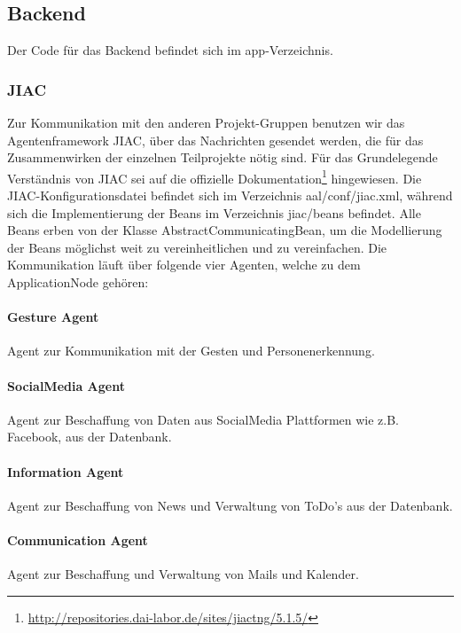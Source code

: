 \documentclass[10pt,a4paper]{report}
\newcommand{\code}[1]{{\fontfamily{cmvtt}\selectfont #1}}
\begin{document}
	

    \newpage
    \subsection{Backend}
    Der Code für das Backend befindet sich im \code{app}-Verzeichnis.
         \subsubsection{JIAC}
        Zur Kommunikation mit den anderen Projekt-Gruppen benutzen wir das Agentenframework JIAC, über das Nachrichten gesendet werden, die für das Zusammenwirken der einzelnen Teilprojekte nötig sind. Für das Grundelegende Verständnis von JIAC sei auf die offizielle Dokumentation\footnote{\href{http://repositories.dai-labor.de/sites/jiactng/5.1.5/}{http://repositories.dai-labor.de/sites/jiactng/5.1.5/}} hingewiesen. Die JIAC-Konfigurationsdatei befindet sich im Verzeichnis \code{aal/conf/jiac.xml}, während sich die Implementierung der Beans im Verzeichnis \code{jiac/beans} befindet. Alle Beans erben von der Klasse \code{AbstractCommunicatingBean}, um die Modellierung der Beans möglichst weit zu vereinheitlichen und zu vereinfachen. Die Kommunikation läuft über folgende vier Agenten, welche zu dem
        ApplicationNode gehören:
        \paragraph{Gesture Agent}
            Agent zur Kommunikation mit der Gesten und Personenerkennung.
        \paragraph{SocialMedia Agent}
            Agent zur Beschaffung von Daten aus
            SocialMedia Plattformen wie z.B. Facebook, aus der Datenbank.
        \paragraph{Information Agent}
            Agent zur Beschaffung von News und Verwaltung
            von ToDo's aus der Datenbank.
        \paragraph{Communication Agent}
            Agent zur Beschaffung und Verwaltung von
            Mails und Kalender.
\end{document}
